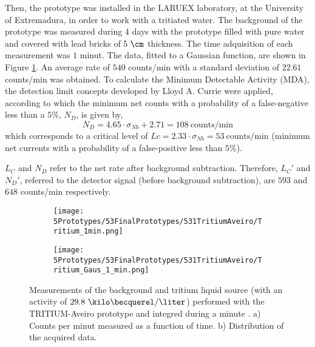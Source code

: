 
Then, the prototype was installed in the LARUEX laboratory, at the University of Extremadura, in order to work with a tritiated water. The background of the prototype was measured during 4 days with the prototype filled with pure water and covered with lead bricks of $5~\cm$ thickness. The time adquisition of each measurement was $1$ minut. The data, fitted to a Gaussian function, are shown in Figure \ref{subfig:MeasurementInRealTime}. An average rate of $540$ counts/min with a standard deviation of $22.61$ counts/min was obtained. To calculate the Minimum Detectable Activity (MDA), the detection limit concepts developed by Lloyd A. Currie \cite{CurieLimit} were applied, according to which the minimum net counts with a probability of a false-negative less than a $5\%$, $N_D$, is given by,
\begin{equation}
N_D = 4.65 \cdot{}\sigma_{Nb} + 2.71 = 108~\text{counts/min}
\label{eq:EquationNetCounts}
\end{equation}
which corresponds to a critical level of $Lc = 2.33\cdot{}\sigma_{Nb}=53 ~\text{counts/min}$ (minimum net currents with a probability of a false-positive less than $5\%$).

$L_C$ and $N_D$ refer to the net rate after background subtraction. Therefore, $L_C'$ and $N_D'$, referred to the detector signal (before background subtraction), are $593$ and $648$ counts/min respectively.

\begin{figure}
\centering
    \begin{subfigure}[b]{0.45\textwidth}
    \centering
    \texttt{[image: 5Prototypes/53FinalPrototypes/531TritiumAveiro/Tritium\_1min.png]}  
    \caption{\label{subfig:MeasurementInRealTime}}
    \end{subfigure}
    \hfill
    \begin{subfigure}[b]{0.45\textwidth}
    \centering
    \texttt{[image: 5Prototypes/53FinalPrototypes/531TritiumAveiro/Tritium\_Gaus\_1\_min.png]}  
    \caption{\label{subfig:DistributionofMeasurement}}
    \end{subfigure}
 \caption{Measurements of the background and tritium liquid source (with an activity of $29.8~\kilo\becquerel/\liter$) performed with the TRITIUM-Aveiro prototype and integred during a minute \cite{ExperimentalPaperCarlos}. a) Counts per minut measured as a function of time. b) Distribution of the acquired data.}
 \label{fig:BackgroundTritium1min}
\end{figure}

